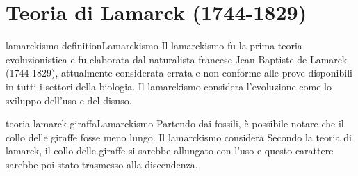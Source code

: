 \documentclass[preview]{standalone}
\begin{document}

\section{Teoria di Lamarck (1744-1829)}

\begin{snippetdefinition}{lamarckismo-definition}{Lamarckismo}
    Il lamarckismo fu la prima teoria evoluzionistica e fu elaborata dal naturalista francese Jean-Baptiste de Lamarck (1744-1829), attualmente considerata errata e non conforme alle prove disponibili in tutti i settori della biologia.
    Il lamarckismo considera l'evoluzione come lo sviluppo dell'uso e del disuso.
\end{snippetdefinition}

\begin{snippetexample}{teoria-lamarck-giraffa}{Lamarckismo}
    Partendo dai fossili, è possibile notare che il collo delle giraffe fosse meno lungo.
    Il lamarckismo considera 
    Secondo la teoria di lamarck, il collo delle giraffe si sarebbe allungato con
    l'uso e questo carattere sarebbe poi stato trasmesso alla discendenza.
\end{snippetexample}
\end{document}
